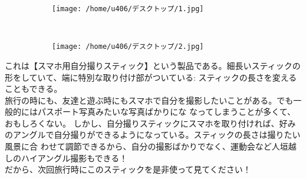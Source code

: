 \documentclass[10pt]{book}
\begin{document}
\begin{figure}
        \centering
        \begin{subfigure}[b]{0.3\textwidth}
                \texttt{[image: /home/u406/デスクトップ/1.jpg]}
        \end{subfigure}%
        ~ %
        \begin{subfigure}[b]{0.075\textwidth}
                \texttt{[image: /home/u406/デスクトップ/2.jpg]}
        \end{subfigure}
\end{figure}
これは【スマホ用自分撮りスティック】という製品である。細長いスティックの形をしていて、端に特別な取り付け部がついている:
スティックの長さを変えることもできる。\\

旅行の時にも、友達と遊ぶ時にもスマホで自分を撮影したいことがある。でも一般的にはパスポート写真みたいな写真ばかりにな
なってしまうことが多くて、おもしろくない。
しかし、自分撮りスティックにスマホを取り付ければ、好みのアングルで自分撮りができるようになっている。スティックの長さは撮りたい風景に合
わせて調節できるから、自分の撮影ばかりでなく、運動会など人垣越しのハイアングル撮影もできる！\\

だから、次回旅行時にこのスティックを是非使って見てください！
\end{document}

